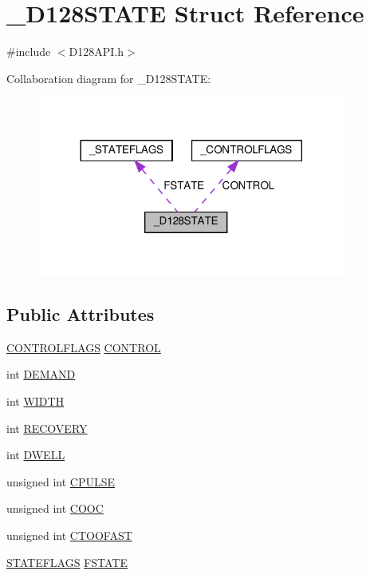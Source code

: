 \hypertarget{struct___d128_s_t_a_t_e}{}\section{\+\_\+\+D128\+S\+T\+A\+TE Struct Reference}
\label{struct___d128_s_t_a_t_e}


{\ttfamily \#include $<$D128\+A\+P\+I.\+h$>$}



Collaboration diagram for \+\_\+\+D128\+S\+T\+A\+TE\+:
\nopagebreak
\begin{figure}[H]
\begin{center}
\leavevmode
\includegraphics[width=288pt]{struct___d128_s_t_a_t_e__coll__graph}
\end{center}
\end{figure}
\subsection*{Public Attributes}
\begin{DoxyCompactItemize}
\item 
\hyperlink{_d128_a_p_i_8h_a91215a38b4f52c701d673f5a9874cc1f}{C\+O\+N\+T\+R\+O\+L\+F\+L\+A\+GS} \hyperlink{struct___d128_s_t_a_t_e_affb79cdddf9d32d31d56f5a6d1cf1213}{C\+O\+N\+T\+R\+OL}
\item 
int \hyperlink{struct___d128_s_t_a_t_e_a832b7acd51b07b57d5564304f877ebed}{D\+E\+M\+A\+ND}
\item 
int \hyperlink{struct___d128_s_t_a_t_e_ae531b72a9e28645c9f99756a12a88fff}{W\+I\+D\+TH}
\item 
int \hyperlink{struct___d128_s_t_a_t_e_aec50cf1e9df443c609e6253c8828c95a}{R\+E\+C\+O\+V\+E\+RY}
\item 
int \hyperlink{struct___d128_s_t_a_t_e_aa53fa740eeafba887916d3afae0c51f5}{D\+W\+E\+LL}
\item 
unsigned int \hyperlink{struct___d128_s_t_a_t_e_acde31c47f1649af4b0ae2d149a3e2f4b}{C\+P\+U\+L\+SE}
\item 
unsigned int \hyperlink{struct___d128_s_t_a_t_e_a3e51e533256c5794bcc2ffc1cb15e9f1}{C\+O\+OC}
\item 
unsigned int \hyperlink{struct___d128_s_t_a_t_e_a045abcc9e24103354e977f059036683c}{C\+T\+O\+O\+F\+A\+ST}
\item 
\hyperlink{_d128_a_p_i_8h_ab368deca56a74b4f97e27c53f957322f}{S\+T\+A\+T\+E\+F\+L\+A\+GS} \hyperlink{struct___d128_s_t_a_t_e_a696a3b0c6cc5eeca3467d45c946ceb9d}{F\+S\+T\+A\+TE}
\end{DoxyCompactItemize}


